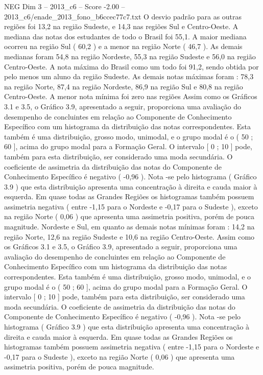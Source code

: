 \begin{textsample}{NEG Dim 3 – 2013\_c6 – Score -2.00 – 2013\_c6/enade\_2013\_fono\_b6ccec77c7.txt}
O desvio padrão para as outras regiões foi 13,2 na região Sudeste, e 14,3 nas regiões Sul e Centro-Oeste.
A mediana das notas dos estudantes de todo o Brasil foi 55,1.
A maior mediana ocorreu na região Sul ( 60,2 ) e a menor na região Norte ( 46,7 ).
As demais medianas foram 54,8 na região Nordeste, 55,3 na região Sudeste e 56,0 na região Centro-Oeste.
A nota máxima do Brasil como um todo foi 91,2, sendo obtida por pelo menos um aluno da região Sudeste.
As demais notas máximas foram : 78,3 na região Norte, 87,4 na região Nordeste, 86,9 na região Sul e 80,8 na região Centro-Oeste.
A menor nota mínima foi zero nas regiões Assim como os Gráficos 3.1 e 3.5, o Gráfico 3.9, apresentado a seguir, proporciona uma avaliação do desempenho de concluintes em relação ao Componente de Conhecimento Específico com um histograma da distribuição das notas correspondentes.
Esta também é uma distribuição, grosso modo, unimodal, e o grupo modal é o ( 50 ; 60 ], acima do grupo modal para a Formação Geral.
O intervalo [ 0 ; 10 ] pode, também para esta distribuição, ser considerado uma moda secundária.
O coeficiente de assimetria da distribuição das notas do Componente de Conhecimento Específico é negativo ( -0,96 ).
Nota -se pelo histograma ( Gráfico 3.9 ) que esta distribuição apresenta uma concentração à direita e cauda maior à esquerda.
Em quase todas as Grandes Regiões os histogramas também possuem assimetria negativa ( entre -1,15 para o Nordeste e -0,17 para o Sudeste ), exceto na região Norte ( 0,06 ) que apresenta uma assimetria positiva, porém de pouca magnitude.
Nordeste e Sul, em quanto as demais notas mínimas foram : 14,2 na região Norte, 12,6 na região Sudeste e 10,6 na região Centro-Oeste.
Assim como os Gráficos 3.1 e 3.5, o Gráfico 3.9, apresentado a seguir, proporciona uma avaliação do desempenho de concluintes em relação ao Componente de Conhecimento Específico com um histograma da distribuição das notas correspondentes.
Esta também é uma distribuição, grosso modo, unimodal, e o grupo modal é o ( 50 ; 60 ], acima do grupo modal para a Formação Geral.
O intervalo [ 0 ; 10 ] pode, também para esta distribuição, ser considerado uma moda secundária.
O coeficiente de assimetria da distribuição das notas do Componente de Conhecimento Específico é negativo ( -0,96 ).
Nota -se pelo histograma ( Gráfico 3.9 ) que esta distribuição apresenta uma concentração à direita e cauda maior à esquerda.
Em quase todas as Grandes Regiões os histogramas também possuem assimetria negativa ( entre -1,15 para o Nordeste e -0,17 para o Sudeste ), exceto na região Norte ( 0,06 ) que apresenta uma assimetria positiva, porém de pouca magnitude.

\end{textsample}
